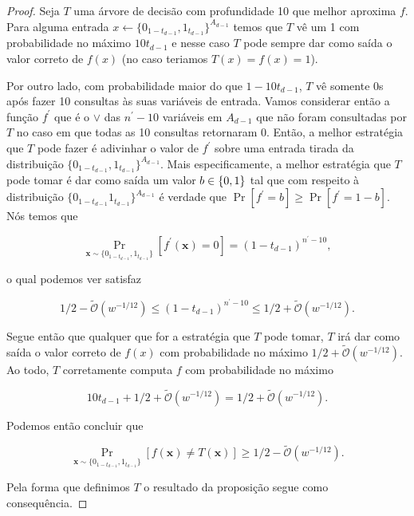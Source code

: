 \begin{proof}

Seja $T$ uma árvore de decisão com profundidade 10 que melhor aproxima $f$. Para alguma entrada $x \leftarrow \{0_{1 - t_{d - 1}}, 1_{t_{d - 1}}\}^{A_{d - 1}}$ temos que $T$ vê um 1 com probabilidade no máximo $10t_{d - 1}$ e nesse caso $T$ pode sempre dar como saída o valor correto de $f(x)$ (no caso teriamos $T(x) = f(x) = 1$). 

Por outro lado, com probabilidade maior do que $1 - 10t_{d - 1}$, $T$ vê somente 0s após fazer 10 consultas às suas variáveis de entrada. Vamos considerar então a função $f^{\prime}$ que é o $\lor$ das $n^{\prime} - 10$ variáveis em $A_{d - 1}$ que não foram consultadas por $T$ no caso em que todas as 10 consultas retornaram 0. Então, a melhor estratégia que $T$ pode fazer é adivinhar o valor de $f^{\prime}$ sobre uma entrada tirada da distribuição $\{0_{1 - t_{d - 1}}, 1_{t_{d - 1}}\}^{A_{d - 1}}$. Mais especificamente, a melhor estratégia que $T$ pode tomar é dar como saída um valor $b \in \{0, 1\}$ tal que com respeito à distribuição $\{0_{1 - t_{d - 1}} 1_{t_{d - 1}}\}^{A_{d - 1}}$ é verdade que $\Pr[f^{\prime} = b] \geq \Pr[f^{\prime} = 1 - b]$. Nós temos que

\begin{equation*}
    \Pr_{\boldsymbol{x} \sim \{0_{1 - t_{d - 1}}, 1_{t_{d - 1}}\}}[f^{\prime}(\boldsymbol{x}) = 0] = (1 - t_{d - 1})^{n^{\prime} - 10},
\end{equation*}

o qual podemos ver satisfaz

\begin{equation*}
    1/2 - \widetilde{\mathcal{O}}(w^{-1/12}) \leq (1 - t_{d - 1})^{n^{\prime} - 10} \leq 1/2 + \widetilde{\mathcal{O}}(w^{-1/12}).
\end{equation*}

Segue então que qualquer que for a estratégia que $T$ pode tomar, $T$ irá dar como saída o valor correto de $f(x)$ com probabilidade no máximo $1/2 + \widetilde{\mathcal{O}}(w^{-1/12})$. Ao todo, $T$ corretamente computa $f$ com probabilidade no máximo

\begin{equation*}
    10t_{d - 1} + 1/2 + \widetilde{\mathcal{O}}(w^{-1/12}) = 1/2 + \widetilde{\mathcal{O}}(w^{-1/12}).
\end{equation*}

Podemos então concluir que

\begin{equation*}
    \Pr_{\boldsymbol{x} \sim \{0_{1 - t_{d - 1}}, 1_{t_{d - 1}}\}}[f(\boldsymbol{x}) \neq T(\boldsymbol{x})] \geq 1/2 - \widetilde{\mathcal{O}}(w^{-1/12}).
\end{equation*}

Pela forma que definimos $T$ o resultado da proposição segue como consequência.

\end{proof}

